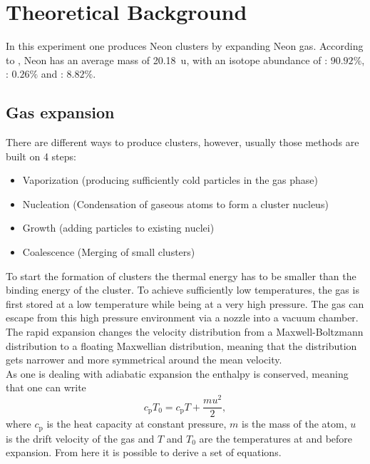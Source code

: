 \documentclass[a4paper,10pt]{article}
\begin{document}
\section{Theoretical Background}
In this experiment one produces Neon clusters by expanding Neon gas. According to \cite{script}, Neon has an average mass of \SI{20.18}{\atomicmassunit}, with an isotope abundance of : $90.92\%$, : $0.26\%$ and : $8.82\%$.

\subsection{Gas expansion}
There are different ways to produce clusters, however, usually those methods are built on 4 steps:
\begin{itemize}
	\item Vaporization (producing sufficiently cold particles in the gas phase)
	\item Nucleation (Condensation of gaseous atoms to form a cluster nucleus)
	\item Growth (adding particles to existing nuclei)
	\item Coalescence (Merging of small clusters)
\end{itemize}
To start the formation of clusters the thermal energy has to be smaller than the binding energy of the cluster. To achieve sufficiently low temperatures, the gas is first stored at a low temperature while being at a very high pressure. The gas can escape from this high pressure environment via a nozzle into a vacuum chamber. The rapid expansion changes the velocity distribution from a Maxwell-Boltzmann distribution to a floating Maxwellian distribution, meaning that the distribution gets narrower and more symmetrical around the mean velocity. \\
As one is dealing with adiabatic expansion the enthalpy is conserved, meaning that one can write
\begin{equation}
	c_\mathrm{p} T_0 = c_\mathrm{p} T + \frac{m u^2}{2},
\end{equation}
where $c_\mathrm{p}$ is the heat capacity at constant pressure, $m$ is the mass of the atom, $u$ is the drift velocity of the gas and $T$ and $T_0$ are the temperatures at and before expansion. From here it is possible to derive a set of equations.
\end{document}
